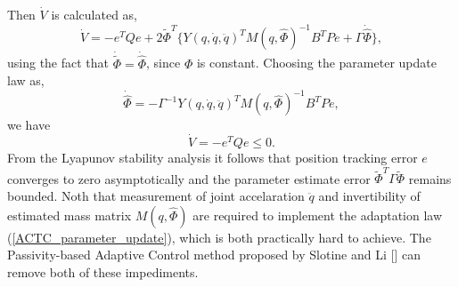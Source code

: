 \documentclass[Afour,sageh,times]{sagej}
\begin{document}
Then $\dot{V}$ is calculated as,
\begin{equation*}
\dot{V} = -e^{T}Qe + 2\tilde{\Phi}^{T}\{Y(q,\dot{q},\ddot{q})^{T}M(q,\hat{\Phi})^{-1}B^{T}Pe+\Gamma\dot{\hat{\Phi}}\},
\end{equation*}
using the fact that $\dot{\tilde{\Phi}} = \dot{\hat{\Phi}}$, since $\Phi$ is constant. Choosing the parameter update law as,
\begin{equation}
\dot{\hat{\Phi}} = -\Gamma^{-1}Y(q,\dot{q},\ddot{q})^{T}M(q,\hat{\Phi})^{-1}B^{T}Pe, \label{ACTC_parameter_update}
\end{equation}
we have 
\begin{equation*}
\dot{V} = -e^{T}Qe \leq 0 .
\end{equation*}
From the Lyapunov stability analysis it follows that position tracking error $e$ converges to zero asymptotically and the parameter estimate error $\tilde{\Phi}^{T}\Gamma\tilde{\Phi}$ remains bounded. Noth that measurement of joint accelaration $\ddot{q}$ and invertibility of estimated mass matrix $M(q,\hat{\Phi})$ are required to implement the adaptation law (\ref{ACTC_parameter_update}), which is both practically hard to achieve. The Passivity-based Adaptive Control method proposed by Slotine and Li [] can remove both of these impediments.
\end{document}
